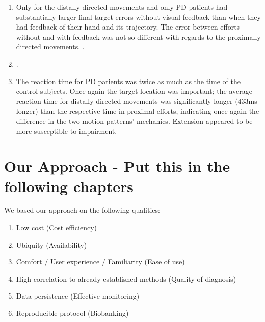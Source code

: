 \begin{enumerate}
\item Only for the distally directed movements and only \gls{PD} patients had substantially larger final target errors without visual feedback than when they had feedback of their hand and its trajectory. The error between efforts without and with feedback was not so different with regards to the proximally directed movements. . 
\item {}.
\item The reaction time for \gls{PD} patients was twice as much as the time of the control subjects. Once again the target location was important; the average reaction time for distally directed movements was significantly longer (433ms longer) than the respective time in proximal efforts, indicating once again the difference in the two motion patterns' mechanics. Extension appeared to be more susceptible to impairment.
\end{enumerate} 



\section{Our Approach - Put this in the following chapters}
\label{sec:ourApproach}
We based our approach on the following qualities:

\begin{enumerate}
\item Low cost (Cost efficiency)
\item Ubiquity (Availability)
\item Comfort / User experience / Familiarity (Ease of use)
\item High correlation to already established methods (Quality of diagnosis)
\item Data persistence (Effective monitoring)
\item Reproducible protocol (Biobanking)
\end{enumerate}